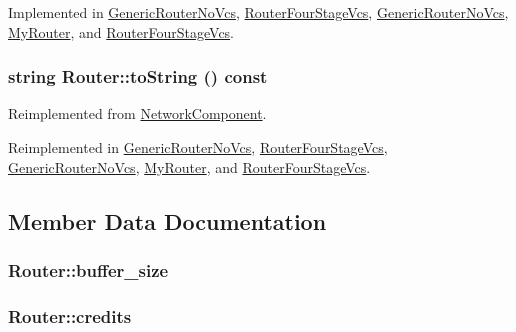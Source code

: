 Implemented in \hyperlink{classGenericRouterNoVcs_877a1b3fac555ef48ad7690429b2be28}{GenericRouterNoVcs}, \hyperlink{classRouterFourStageVcs_991fb1adc65124da8dc100855835a193}{RouterFourStageVcs}, \hyperlink{classGenericRouterNoVcs_877a1b3fac555ef48ad7690429b2be28}{GenericRouterNoVcs}, \hyperlink{classMyRouter_ceb204776c6ed1fcbc0179b1d57e0ba3}{MyRouter}, and \hyperlink{classRouterFourStageVcs_991fb1adc65124da8dc100855835a193}{RouterFourStageVcs}.\hypertarget{classRouter_1e749a51dcf6cbd6925ac677473c7f58}{
\subsubsection[{toString}]{\setlength{\rightskip}{0pt plus 5cm}string Router::toString () const}}
\label{classRouter_1e749a51dcf6cbd6925ac677473c7f58}




Reimplemented from \hyperlink{classNetworkComponent_9bb9874e1f5705588cb3d9c201d8fc6f}{NetworkComponent}.

Reimplemented in \hyperlink{classGenericRouterNoVcs_59307c319fbca5732d750630be9ee27c}{GenericRouterNoVcs}, \hyperlink{classRouterFourStageVcs_0f2d0c3bcd780832ec371374eb3950fd}{RouterFourStageVcs}, \hyperlink{classGenericRouterNoVcs_59307c319fbca5732d750630be9ee27c}{GenericRouterNoVcs}, \hyperlink{classMyRouter_9b40e1d62a4638fb84f31aff143d970d}{MyRouter}, and \hyperlink{classRouterFourStageVcs_0f2d0c3bcd780832ec371374eb3950fd}{RouterFourStageVcs}.

\subsection{Member Data Documentation}
\hypertarget{classRouter_b456618374083b8f2ec3c8e889d45bac}{
\subsubsection[{buffer\_\-size}]{ {\bf Router::buffer\_\-size}}}
\label{classRouter_b456618374083b8f2ec3c8e889d45bac}


\hypertarget{classRouter_d747f5b948a9ef1497de6d4bb97b8f03}{
\subsubsection[{credits}]{ {\bf Router::credits}}}
\label{classRouter_d747f5b948a9ef1497de6d4bb97b8f03}


